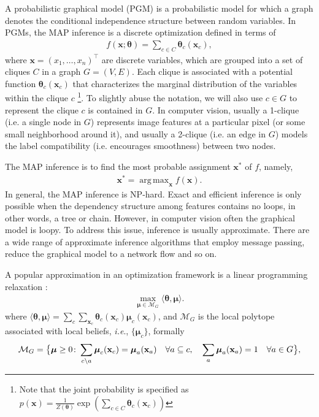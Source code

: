 \documentclass[conference]{IEEEtran}
\DeclareMathOperator*{\argmax}{arg\,max}
\def\ie{\emph{i.e}.} \def\Ie{\emph{I.e}.}
\newcommand{\mx}{\mathbf{x}}
\newcommand{\mM}{\mathcal{M}}
\newcommand{\mth}{\mathbf{\boldsymbol \theta}}
\newcommand{\mmu}{\mathbf{\boldsymbol \mu}}
\newcommand{\la}{\langle}
\newcommand{\ra}{\rangle}
\begin{document}
A probabilistic graphical model (PGM) is a probabilistic model for which a graph denotes the conditional independence structure between random variables. In PGMs, the MAP inference is a discrete optimization defined in terms of 
\begin{align}
	f(\mx; \mth) = \sum_{c \in C} \mth_c(\mx_c),
\end{align}
where $\mx = (x_1, \ldots, x_n)^\top$ are discrete variables, which are grouped into a set of cliques $C$ in a graph $G = (V,E)$. Each clique is associated with a potential function $\mth_c(\mx_c)$ that characterizes the marginal distribution of the variables within the clique $c$ \footnote{Note that the joint probability is specified as $p(\mx) = \frac{1}{Z(\mth)} \exp(\sum_{c \in C} \mth_c(\mx_c))$}. To slightly abuse the notation, we will also use $c \in G$ to represent the clique $c$ is contained in $G$. In computer vision, usually a 1-clique (i.e. a single node in $G$) represents image features at a particular pixel (or some small neighborhood around it), and usually a 2-clique (i.e. an edge in $G$) models the label compatibility (i.e. encourages smoothness) between two nodes.

The MAP inference is to find the most probable assignment $\mx^*$ of $f$, namely,
\begin{align}
	\mx^* = \argmax_{\mx} f(\mx).
\end{align}
In general, the MAP inference is NP-hard. Exact and efficient inference is only possible when the dependency structure among features contains no loops, in other words, a tree or chain. However, in computer vision often the graphical model is loopy.  To address this issue, inference is usually approximate. There are a wide range of approximate inference algorithms that employ message passing, reduce the graphical model to a network flow and so on.

A popular approximation in an optimization framework is a linear programming relaxation \cite{Yanover06}:
\begin{align}
	\max_{\mmu \in \mM_G} \la \mth,\mmu \ra.
	\label{eq:lpr}
\end{align}
where $\la \mth,\mmu \ra = \sum_c \sum_{\mx_c} \mth_c(\mx_c) \mmu_c(\mx_c)$, and $\mM_G$ is the local polytope associated with local beliefs, \ie, $\{\mmu_c\}$, formally
\begin{align}
	\mM_G = \big{\{} \mmu \geq 0 \colon \sum_{c \setminus a} \mmu_c(\mx_c) = \mmu_a(\mx_a) \quad \forall a \subseteq c, \quad \sum_a \mmu_a(\mx_a) = 1 \quad \forall a \in G \big{\}},
\end{align}
\end{document}
